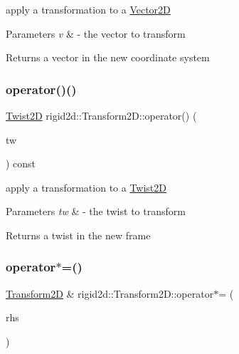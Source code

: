 apply a transformation to a \hyperlink{structrigid2d_1_1Vector2D}{Vector2D} 


\begin{DoxyParams}{Parameters}
{\em v} & -\/ the vector to transform \\
\hline
\end{DoxyParams}
\begin{DoxyReturn}{Returns}
a vector in the new coordinate system 
\end{DoxyReturn}
\mbox{\label{classrigid2d_1_1Transform2D_ad31ac545a107b5aea5a9a2c69b77ab6c}} 
\subsubsection{\texorpdfstring{operator()()}{operator()()}\hspace{0.1cm}{\footnotesize\ttfamily [2/2]}}
{\footnotesize\ttfamily \hyperlink{structrigid2d_1_1Twist2D}{Twist2D} rigid2d\+::\+Transform2\+D\+::operator() (\begin{DoxyParamCaption}\item[{\hyperlink{structrigid2d_1_1Twist2D}{Twist2D}}]{tw }\end{DoxyParamCaption}) const}



apply a transformation to a \hyperlink{structrigid2d_1_1Twist2D}{Twist2D} 


\begin{DoxyParams}{Parameters}
{\em tw} & -\/ the twist to transform \\
\hline
\end{DoxyParams}
\begin{DoxyReturn}{Returns}
a twist in the new frame 
\end{DoxyReturn}
\mbox{\label{classrigid2d_1_1Transform2D_ab8ae83c47e43afdcc0b2bcca0ae34fb7}} 
\subsubsection{\texorpdfstring{operator$\ast$=()}{operator*=()}}
{\footnotesize\ttfamily \hyperlink{classrigid2d_1_1Transform2D}{Transform2D} \& rigid2d\+::\+Transform2\+D\+::operator$\ast$= (\begin{DoxyParamCaption}\item[{const \hyperlink{classrigid2d_1_1Transform2D}{Transform2D} \&}]{rhs }\end{DoxyParamCaption})}



